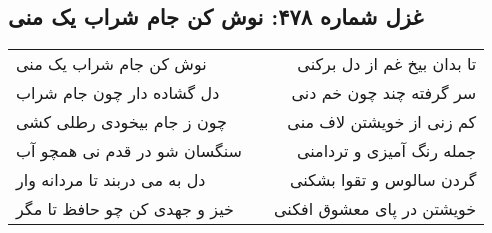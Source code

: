 \begin{center}
\section*{غزل شماره ۴۷۸: نوش کن جام شراب یک منی}
\label{sec:sh478}
\begin{longtable}{l p{0.5cm} r}
نوش کن جام شراب یک منی
&&
تا بدان بیخ غم از دل برکنی
\\
دل گشاده دار چون جام شراب
&&
سر گرفته چند چون خم دنی
\\
چون ز جام بیخودی رطلی کشی
&&
کم زنی از خویشتن لاف منی
\\
سنگسان شو در قدم نی همچو آب
&&
جمله رنگ آمیزی و تردامنی
\\
دل به می دربند تا مردانه وار
&&
گردن سالوس و تقوا بشکنی
\\
خیز و جهدی کن چو حافظ تا مگر
&&
خویشتن در پای معشوق افکنی
\\
\end{longtable}
\end{center}
